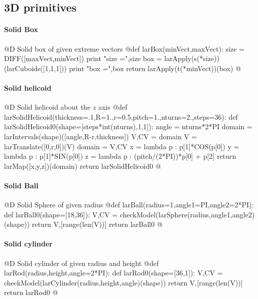 \documentclass[11pt,oneside]{article}	%
\begin{document}
\subsection{3D primitives}


\paragraph{Solid Box}
@D Solid box of given extreme vectors
@{def larBox(minVect,maxVect):
	size = DIFF([maxVect,minVect])
	print "size =",size
	box = larApply(s(*size))(larCuboids([1,1,1]))
	print "box =",box
	return larApply(t(*minVect))(box)
@}

\paragraph{Solid helicoid}
@D Solid helicoid about the $z$ axis
@{def larSolidHelicoid(thickness=.1,R=1.,r=0.5,pitch=1.,nturns=2.,steps=36):
	def larSolidHelicoid0(shape=[steps*int(nturns),1,1]):
		angle = nturns*2*PI
		domain = larIntervals(shape)([angle,R-r,thickness])
		V,CV = domain
		V = larTranslate([0,r,0])(V)
		domain = V,CV
		x = lambda p : p[1]*COS(p[0])
		y = lambda p : p[1]*SIN(p[0])
		z = lambda p : (pitch/(2*PI))*p[0] + p[2]
		return larMap([x,y,z])(domain)
	return larSolidHelicoid0
@}


\paragraph{Solid Ball}
@D Solid Sphere of given radius
@{def larBall(radius=1,angle1=PI,angle2=2*PI):
	def larBall0(shape=[18,36]):
		V,CV = checkModel(larSphere(radius,angle1,angle2)(shape))
		return V,[range(len(V))]
	return larBall0
@}

\paragraph{Solid cylinder}
@D Solid cylinder of given radius and height
@{def larRod(radius,height,angle=2*PI):
	def larRod0(shape=[36,1]):
		V,CV = checkModel(larCylinder(radius,height,angle)(shape))
		return V,[range(len(V))]
	return larRod0
@}
\end{document}
